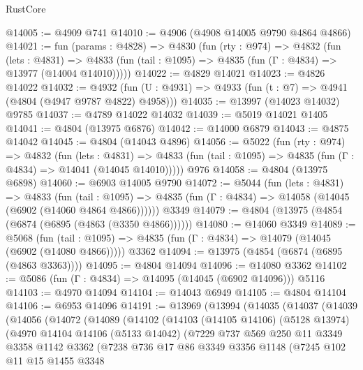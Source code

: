 \begin{lexlean}{RustCore}
\begin{coremodule}
@14005 := @4909 @741
@14010 := @4906 (@4908 @14005 @9790 @4864 @4866)
@14021 := fun (params : @4828) =>
  @4830
    (fun (rty : @974) =>
    @4832
      (fun (lets : @4831) =>
      @4833 (fun (tail : @1095) => @4835 (fun (Γ : @4834) => @13977 (@14004 @14010)))))
@14022 := @4829 @14021
@14023 := @4826 @14022
@14032 := @4932 (fun (U : @4931) => @4933 (fun (t : @7) => @4941 (@4804 (@4947 @9787 @4822) @4958)))
@14035 := @13997 (@14023 @14032) @9785
@14037 := @4789 @14022 @14032
@14039 := @5019 @14021 @1405
@14041 := @4804 (@13975 @6876)
@14042 := @14000 @6879
@14043 := @4875 @14042
@14045 := @4804 (@14043 @4896)
@14056 := @5022
    (fun (rty : @974) =>
    @4832
      (fun (lets : @4831) =>
      @4833 (fun (tail : @1095) => @4835 (fun (Γ : @4834) => @14041 (@14045 @14010)))))
    @976
@14058 := @4804 (@13975 @6898)
@14060 := @6903 @14005 @9790
@14072 := @5044
    (fun (lets : @4831) =>
    @4833
      (fun (tail : @1095) =>
      @4835 (fun (Γ : @4834) => @14058 (@14045 (@6902 (@14060 @4864 @4866))))))
    @3349
@14079 := @4804 (@13975 (@4854 (@6874 (@6895 (@4863 (@3350 @4866))))))
@14080 := @14060 @3349
@14089 := @5068
    (fun (tail : @1095) => @4835 (fun (Γ : @4834) => @14079 (@14045 (@6902 (@14080 @4866)))))
    @3362
@14094 := @13975 (@4854 (@6874 (@6895 (@4863 @3363))))
@14095 := @4804 @14094
@14096 := @14080 @3362
@14102 := @5086 (fun (Γ : @4834) => @14095 (@14045 (@6902 @14096))) @5116
@14103 := @4970 @14094
@14104 := @14043 @6949
@14105 := @4804 @14104
@14106 := @6953 @14096
@14191 := @13969
    (@13994
      (@14035
        (@14037
          (@14039
            (@14056
              (@14072
                (@14089
                  (@14102
                    (@14103
                      (@14105 @14106)
                      (@5128 @13974)
                      (@4970
                        @14104
                        @14106
                        (@5133 @14042)
                        (@7229
                          @737
                          @569
                          @250
                          @11
                          @3349
                          @3358
                          @1142
                          @3362
                          (@7238
                            @736
                            @17
                            @86
                            @3349
                            @3356
                            @1148
                            (@7245
                              @102
                              @11
                              @15
                              @1455
                              @3348

\end{coremodule}
\end{lexlean}
